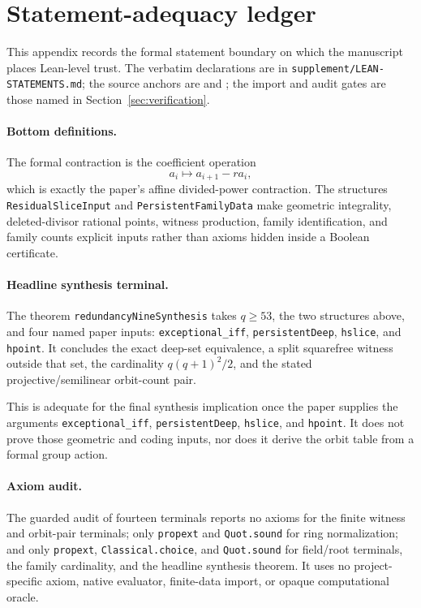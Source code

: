\section{Statement-adequacy ledger}\label{app:adequacy}

This appendix records the formal statement boundary on which the
manuscript places Lean-level trust.  The verbatim declarations are in
\texttt{supplement/LEAN-STATEMENTS.md}; the source anchors are
 and
; the import and audit
gates are those named in Section~\ref{sec:verification}.

\paragraph{Bottom definitions.}
The formal contraction is the coefficient operation
\[
 a_i\longmapsto a_{i+1}-ra_i,
\]
which is exactly the paper's affine divided-power contraction.
The structures
\texttt{Residual\allowbreak Slice\allowbreak Input} and
\texttt{Persistent\allowbreak Family\allowbreak Data}
make geometric integrality, deleted-divisor rational points,
witness production, family identification, and family counts explicit
inputs rather than axioms hidden inside a Boolean certificate.

\paragraph{Headline synthesis terminal.}
The theorem \texttt{redundancyNineSynthesis} takes $q\geq53$, the two
structures above, and four named paper inputs:
\texttt{exceptional\_iff}, \texttt{persistentDeep},
\texttt{hslice}, and \texttt{hpoint}.  It concludes the exact
deep-set equivalence, a split squarefree witness outside that set, the
cardinality $q(q+1)^2/2$, and the stated projective/semilinear
orbit-count pair.

This is adequate for the final synthesis implication once the paper supplies
the arguments \texttt{exceptional\_iff}, \texttt{persistentDeep},
\texttt{hslice}, and \texttt{hpoint}.  It does not prove those
geometric and coding inputs, nor does it derive the orbit table from a
formal group action.

\paragraph{Axiom audit.}
The guarded audit of fourteen terminals reports no axioms for the
finite witness and orbit-pair terminals; only
\texttt{propext} and \texttt{Quot.sound} for ring normalization; and
only \texttt{propext}, \texttt{Classical.choice}, and
\texttt{Quot.sound} for field/root terminals, the family cardinality,
and the headline synthesis theorem.  It uses no project-specific
axiom, native evaluator, finite-data import, or opaque computational
oracle.
